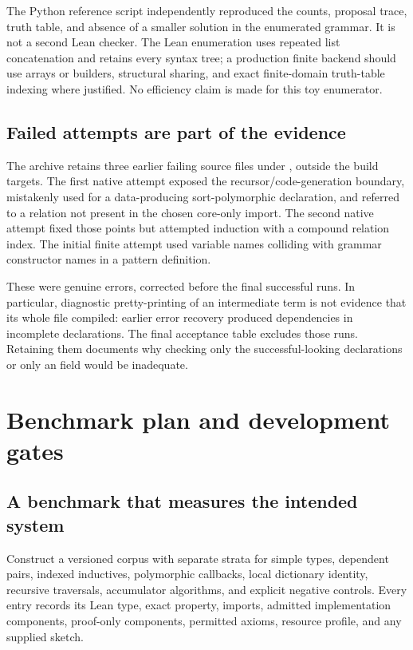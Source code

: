 The Python reference script independently reproduced the counts, proposal trace, truth table, and absence of a smaller solution in the enumerated grammar. It is not a second Lean checker. The Lean enumeration uses repeated list concatenation and retains every syntax tree; a production finite backend should use arrays or builders, structural sharing, and exact finite-domain truth-table indexing where justified. No efficiency claim is made for this toy enumerator.

\subsection{Failed attempts are part of the evidence}

The archive retains three earlier failing source files under , outside the build targets. The first native attempt exposed the recursor/code-generation boundary, mistakenly used  for a data-producing sort-polymorphic declaration, and referred to a relation not present in the chosen core-only import. The second native attempt fixed those points but attempted induction with a compound relation index. The initial finite attempt used variable names colliding with grammar constructor names in a pattern definition.

These were genuine errors, corrected before the final successful runs. In particular, diagnostic pretty-printing of an intermediate term is not evidence that its whole file compiled: earlier error recovery produced  dependencies in incomplete declarations. The final acceptance table excludes those runs. Retaining them documents why checking only the successful-looking declarations or only an  field would be inadequate.

\section{Benchmark plan and development gates}
\label{sec:roadmap}

\subsection{A benchmark that measures the intended system}

Construct a versioned corpus with separate strata for simple types, dependent pairs, indexed inductives, polymorphic callbacks, local dictionary identity, recursive traversals, accumulator algorithms, and explicit negative controls. Every entry records its Lean type, exact property, imports, admitted implementation components, proof-only components, permitted axioms, resource profile, and any supplied sketch.

